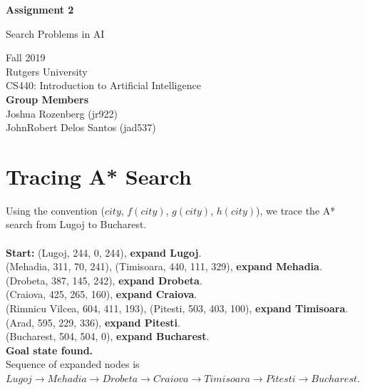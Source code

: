 \documentclass{article}
\begin{document}
\begin{titlepage}
    \begin{center}
        \vspace*{1cm}
 
        \Huge
        \textbf{Assignment 2}
 
        \vspace{0.5cm}
        \LARGE
        Search Problems in AI
 
        \vspace{1.5cm}
 
        \vspace{0.8cm}
  
        \Large
        Fall 2019\\
        Rutgers University\\
        CS440: Introduction to Artificial Intelligence\\
       	
       	\vspace{2cm}
        \large
        \textbf{Group Members} \\
        Joshua Rozenberg (jr922)\\
        JohnRobert Delos Santos (jad537)\\
   
    \end{center}
\end{titlepage}

\newpage
{}

\section{Tracing A* Search}
Using the convention ($city$, $f(city)$, $g(city)$, $h(city)$), we trace the A* search from Lugoj to Bucharest.\\\\
\textbf{Start:} (Lugoj, 244, 0, 244), \textbf{expand Lugoj}.\\
(Mehadia, 311, 70, 241), (Timisoara, 440, 111, 329), \textbf{expand Mehadia}.\\
(Drobeta, 387, 145, 242), \textbf{expand Drobeta}.\\
(Craiova, 425, 265, 160), \textbf{expand Craiova}.\\
(Rimnicu Vilcea, 604, 411, 193), (Pitesti, 503, 403, 100), \textbf{expand Timisoara}.\\
(Arad, 595, 229, 336), \textbf{expand Pitesti}.\\
(Bucharest, 504, 504, 0), \textbf{expand Bucharest}.\\
\textbf{Goal state found.}\\
Sequence of expanded nodes is $Lugoj \rightarrow Mehadia \rightarrow Drobeta \rightarrow Craiova \rightarrow Timisoara \rightarrow Pitesti \rightarrow Bucharest$.
\end{document}
